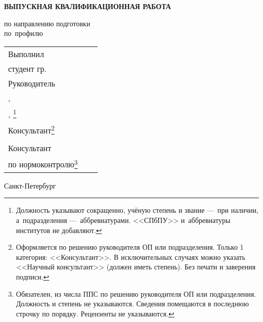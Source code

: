 \vspace{0pt plus2fill} %


{\centering%
	
	\MakeUppercase{\bfseries{}Выпускная квалификационная работа} \\ 
	\MakeUppercase{\thesisDegree}%


{\centering%
	\MakeUppercase{\bfseries{\thesisTitle}}}%

}\par%

\noindent	по направлению подготовки \thesisSpecialtyCodeAndTitle{}\\%
\noindent	по~профилю	\thesisOPCodeAndTitle %
\par%





\vspace{4mm plus2fill}%

\noindent
\begin{tabularx}{\linewidth}{lXl}
	Выполнил              &	   &             \\
	студент гр.~\group     &    & \Author     \\[\mfloatsep]

	Руководитель 		  &    &             \\
	\SupervisorJob,		  &    &             \\
	\SupervisorDegree, \SupervisorTitle\footnote{Должность указывают сокращенно, учёную степень и звание ---~при наличии, а~подразделения ---~аббревиатурами. <<СПбПУ>> и~аббревиатуры институтов не добавляют.} 	  &    & \Supervisor \\[\mfloatsep]
	
	Консультант\footnote{Оформляется по решению руководителя ОП или подразделения. Только 1 категория: <<Консультант>>. В исключительных случаях можно указать <<Научный консультант>> (должен иметь степень). Без печати и заверения подписи.}		  &    & 			 \\
	\ConsultantExtraDegree 	  &    & \ConsultantExtra\\[\mfloatsep]
	
	Консультант  &    &  \\   	
	по нормоконтролю\footnote{Обязателен, из числа ППС по решению руководителя ОП или подразделения. Должность и степень не указываются. Сведения помещаются в последнюю строчку по порядку. Рецензенты не указываются.}  		 	  &    & \ConsultantNorm  %
\end{tabularx} %


%
\vspace{0pt plus4fill}%


\begin{center}%
Санкт-Петербург\\
\thesisYear
\end{center}%
\restoregeometry
\newpage
